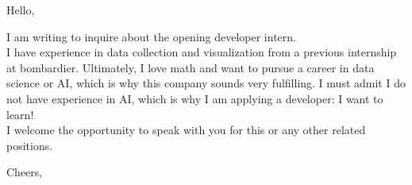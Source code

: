 \documentclass{letter}
\begin{document}

\begin{letter}{}
\address{Montréal, Canada}

\opening{Hello,}


I am writing to inquire about the opening developer intern.\\
 I have experience in data collection and visualization from a previous internship at bombardier. Ultimately, I love math and want to pursue a career in data science or AI, which is why this company sounds very fulfilling. I must admit I do not have experience in AI, which is why I am applying a developer: I want to learn!\\
I welcome the opportunity to speak with you for this or any other related positions.
\signature{Maxime}

\closing{Cheers,}


\end{letter}
\end{document}
